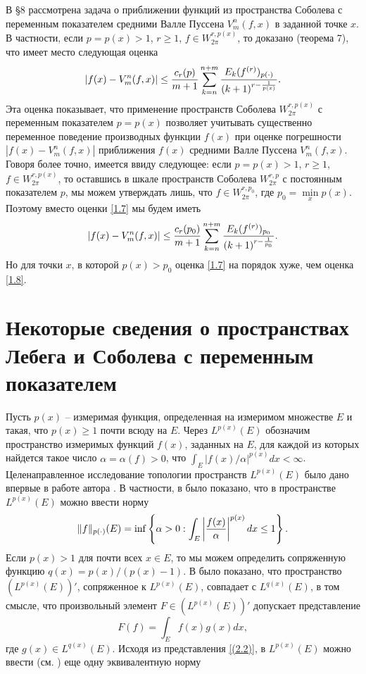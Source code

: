 В \S8 рассмотрена  задача о приближении функций из пространства Соболева с переменным показателем средними Валле Пуссена $V_m^n(f,x)$  в заданной точке $x$.  В частности, если  $p=p(x)>1$, $r\ge1$, $f\in W^{r,p(x)}_{2\pi}$, то доказано (теорема 7), что имеет место следующая оценка
 \begin{equation}\label{1.7}
    |f(x)-V_m^n(f,x)|\le \frac{c_r(p)}{m+1}\sum_{k=n}^{n+m}{E_k(f^{(r)})_{p(\cdot)}\over (k+1)^{r-{\frac{1}{p(x)}}}}.
 \end{equation}
Эта оценка показывает, что применение пространств Соболева  $W^{r,p(x)}_{2\pi}$ с переменным показателем $p=p(x)$ позволяет учитывать существенно переменное поведение производных функции  $f(x)$  при оценке погрешности $|f(x)-V_m^n(f,x)|$ приближения  $f(x)$ средними Валле Пуссена $V_m^n(f,x)$. Говоря более точно, имеется ввиду следующее: если $p=p(x)>1$, $r\ge1$, $f\in W^{r,p(x)}_{2\pi}$, то оставшись в шкале пространств Соболева $W^{r,p}_{2\pi}$ с постоянным показателем $p$, мы можем утверждать лишь, что  $f\in W^{r,p_0}_{2\pi}$, где $p_0=\min\limits_x p(x)$. Поэтому вместо оценки \eqref{1.7} мы будем иметь
\begin{equation}\label{1.8}
    |f(x)-V_m^n(f,x)|\le \frac{c_r(p_0)}{m+1}\sum_{k=n}^{n+m}{E_k(f^{(r)})_{p_0}\over (k+1)^{r-{\frac{1}{p_0}}}}.
 \end{equation}
Но для точки $x$, в которой $p(x)>p_0$ оценка \eqref{1.7} на порядок хуже, чем оценка \eqref{1.8}.









\section{ Некоторые сведения о пространствах Лебега и Соболева с переменным показателем}\label{s2}
Пусть $p(x)$ -- измеримая функция, определенная на измеримом множестве $E$ и такая, что $p(x)\ge1$ почти всюду на $E$. Через $L^{p(x)}(E)$ обозначим пространство измеримых функций $f(x)$, заданных на $E$, для каждой из  которых найдется такое число $\alpha=\alpha(f)>0$, что $\int_E|f(x)/\alpha|^{p(x)}dx<\infty$.  Целенаправленное исследование топологии пространств $L^{p(x)}(E)$  было дано впервые в работе автора
\cite{Shar4}. В частности, в \cite{Shar4} было показано, что в пространстве $L^{p(x)}(E)$ можно ввести норму
\begin{equation}\label{2.1}
    \|f\|_{p(\cdot)}(E)=\inf \left\{\alpha>0:   \int_E\left|{f(x)\over\alpha}\right|^{p(x)}dx\le1\right\}.
\end{equation}
Если $p(x)>1$ для почти всех $x\in E$, то мы можем определить сопряженную функцию $q(x)=p(x)/(p(x)-1)$. В \cite{Shar4} было показано, что пространство $(L^{p(x)}(E))'$, сопряженное к   $L^{p(x)}(E)$, совпадает с $L^{q(x)}(E)$,  в том смысле, что произвольный элемент $F\in(L^{p(x)}(E))' $ допускает представление
\begin{equation}\label{(2.2)}
    F(f)=\int_E f(x)g(x)dx,
\end{equation}
где $g(x)\in L^{q(x)}(E)$. Исходя из представления \eqref{(2.2)},  в $L^{p(x)}(E)$ можно ввести (см.\cite{Shar3} ) еще одну эквивалентную норму

